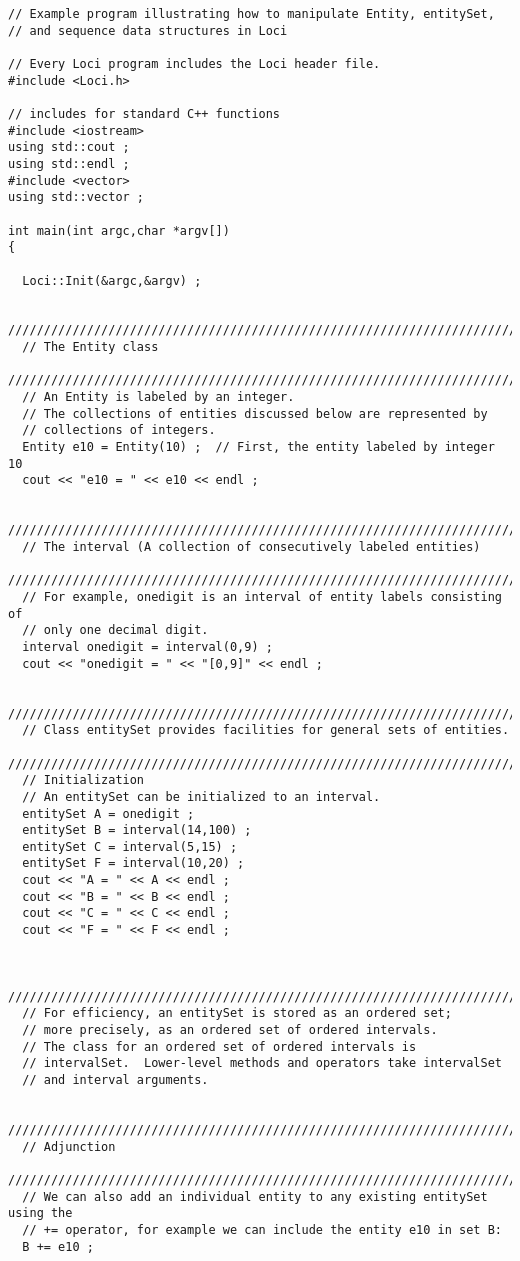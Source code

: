 \begin{verbatim}
// Example program illustrating how to manipulate Entity, entitySet,
// and sequence data structures in Loci

// Every Loci program includes the Loci header file.
#include <Loci.h>

// includes for standard C++ functions
#include <iostream>
using std::cout ;
using std::endl ;
#include <vector>
using std::vector ;

int main(int argc,char *argv[])
{

  Loci::Init(&argc,&argv) ;
  
  ////////////////////////////////////////////////////////////////////////////
  // The Entity class 
  ////////////////////////////////////////////////////////////////////////////
  // An Entity is labeled by an integer.
  // The collections of entities discussed below are represented by
  // collections of integers.
  Entity e10 = Entity(10) ;  // First, the entity labeled by integer 10
  cout << "e10 = " << e10 << endl ;

  ////////////////////////////////////////////////////////////////////////////
  // The interval (A collection of consecutively labeled entities)
  ////////////////////////////////////////////////////////////////////////////
  // For example, onedigit is an interval of entity labels consisting of
  // only one decimal digit.
  interval onedigit = interval(0,9) ;
  cout << "onedigit = " << "[0,9]" << endl ; 

  ////////////////////////////////////////////////////////////////////////////
  // Class entitySet provides facilities for general sets of entities.
  ////////////////////////////////////////////////////////////////////////////
  // Initialization
  // An entitySet can be initialized to an interval.
  entitySet A = onedigit ;
  entitySet B = interval(14,100) ;
  entitySet C = interval(5,15) ;
  entitySet F = interval(10,20) ;
  cout << "A = " << A << endl ; 
  cout << "B = " << B << endl ; 
  cout << "C = " << C << endl ;
  cout << "F = " << F << endl ; 


  ////////////////////////////////////////////////////////////////////////////
  // For efficiency, an entitySet is stored as an ordered set; 
  // more precisely, as an ordered set of ordered intervals.
  // The class for an ordered set of ordered intervals is
  // intervalSet.  Lower-level methods and operators take intervalSet
  // and interval arguments.  

  ////////////////////////////////////////////////////////////////////////////
  // Adjunction
  ////////////////////////////////////////////////////////////////////////////
  // We can also add an individual entity to any existing entitySet using the
  // += operator, for example we can include the entity e10 in set B:
  B += e10 ;


\end{verbatim}
